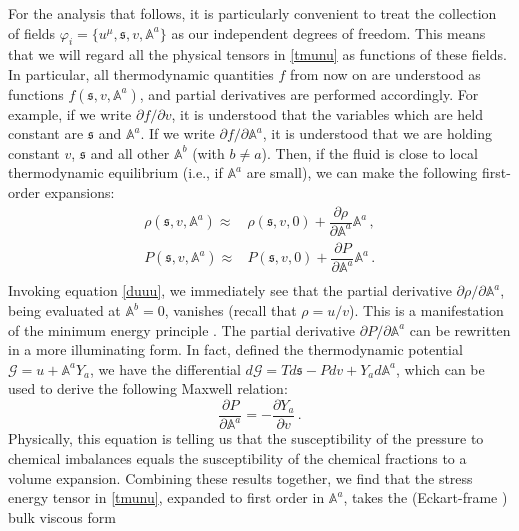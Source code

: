 \documentclass[a4paper, amsfonts, amssymb, amsmath, reprint, showkeys, nofootinbib, twoside, onecolumn,notitlepage]{revtex4-1}
\begin{document}
For the analysis that follows, it is particularly convenient to treat the collection of fields $\varphi_i =\{u^\mu, \mathfrak{s},v,\mathbb{A}^a \}$ as our independent degrees of freedom. This means that we will regard all the physical tensors in \eqref{tmunu} as functions of these fields. In particular, all thermodynamic quantities $f$ from now on are understood as functions $f(\mathfrak{s},v,\mathbb{A}^a)$, and partial derivatives are performed accordingly.  For example, if we write $\partial f/\partial v$, it is understood that the variables which are held constant are $\mathfrak{s}$ and $\mathbb{A}^a$. If we write $\partial f/\partial \mathbb{A}^a$, it is understood that we are holding constant $v$, $\mathfrak{s}$ and all other $\mathbb{A}^b$ (with $b \neq a$). Then, if the fluid is close to local thermodynamic equilibrium (i.e., if $\mathbb{A}^a$ are small), we can make the following first-order  expansions:
\begin{equation}
\begin{split}
\rho(\mathfrak{s},v,\mathbb{A}^a) \approx{}& \rho(\mathfrak{s},v,0) +\dfrac{\partial \rho}{\partial \mathbb{A}^a} \mathbb{A}^a \, , \\
P(\mathfrak{s},v,\mathbb{A}^a) \approx{}& P(\mathfrak{s},v,0) +\dfrac{\partial P}{\partial \mathbb{A}^a} \mathbb{A}^a \, .  \\ 
\end{split}
\end{equation}
Invoking equation \eqref{duuu}, we immediately see that the partial derivative $\partial \rho/\partial \mathbb{A}^a$, being evaluated at $\mathbb{A}^b=0$, vanishes (recall that $\rho=u/v$). This is a manifestation of the minimum energy principle \cite{Callen_book}. The partial derivative $\partial P/\partial \mathbb{A}^a$ can be rewritten in a more illuminating form. In fact, defined the thermodynamic potential $\mathcal{G}=u+\mathbb{A}^a Y_a$, we have the differential $d\mathcal{G}=Td \mathfrak{s}-Pdv+Y_a d\mathbb{A}^a$, which can be used to derive the following Maxwell relation:
\begin{equation}
\dfrac{\partial P}{\partial \mathbb{A}^a} = -\dfrac{\partial Y_a}{\partial v} \, .
\end{equation}
Physically, this equation is telling us that the susceptibility of the pressure to chemical imbalances equals the susceptibility of the chemical fractions to a volume expansion. Combining these results together, we find that the stress energy tensor in \eqref{tmunu}, expanded to first order in $\mathbb{A}^a$, takes the (Eckart-frame \cite{Eckart40,Bemfica2019_conformal1,
BemficaDNDefinitivo2020}) bulk viscous form
\end{document}
